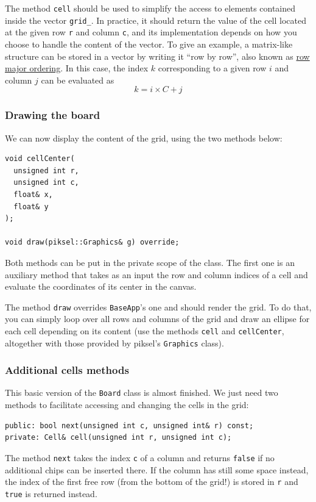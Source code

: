 \documentclass{article}
\begin{document}
The method \texttt{cell} should be used to simplify the access to elements contained inside the vector \texttt{grid\string_}. In practice, it should return the value of the cell located at the given row \texttt{r} and column \texttt{c}, and its implementation depends on how you choose to handle the content of the vector. To give an example, a matrix-like structure can be stored in a vector by writing it ``row by row'', also known as \href{https://en.wikipedia.org/wiki/Row-_and_column-major_order#Programming_languages_and_libraries}{row major ordering}. In this case, the index $k$ corresponding to a given row $i$ and column $j$ can be evaluated as $$k = i \times C + j$$


\subsubsection{Drawing the board}

We can now display the content of the grid, using the two methods below:
\begin{lstlisting}[style=mycpp,numbers=none]
void cellCenter(
  unsigned int r,
  unsigned int c,
  float& x,
  float& y
);

void draw(piksel::Graphics& g) override;
\end{lstlisting}
Both methods can be put in the private scope of the class. The first one is an auxiliary method that takes as an input the row and column indices of a cell and evaluate the coordinates of its center in the canvas.

The method \texttt{draw} overrides \texttt{BaseApp}'s one and should render the grid. To do that, you can simply loop over all rows and columns of the grid and draw an ellipse for each cell depending on its content (use the methods \texttt{cell} and \texttt{cellCenter}, altogether with those provided by piksel's \texttt{Graphics} class).


\subsubsection{Additional cells methods}

This basic version of the \texttt{Board} class is almost finished. We just need two methods to facilitate accessing and changing the cells in the grid:
\begin{lstlisting}[style=mycpp,numbers=none]
public: bool next(unsigned int c, unsigned int& r) const;
private: Cell& cell(unsigned int r, unsigned int c);
\end{lstlisting}
The method \texttt{next} takes the index \texttt{c} of a column and returns \texttt{false} if no additional chips can be inserted there. If the column has still some space instead, the index of the first free row (from the bottom of the grid!) is stored in \texttt{r} and \texttt{true} is returned instead.
\end{document}
